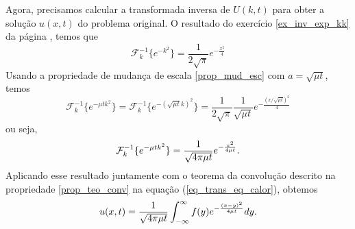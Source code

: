 Agora, precisamos calcular a transformada inversa de $U(k,t)$ para obter a solução $u(x,t)$ do problema original. O resultado do exercício \ref{ex_inv_exp_kk} da página \pageref{ex_inv_exp_kk}, temos que
$$
\mathcal{F}^{-1}_k\{e^{-k^2}\}=\frac{1}{2\sqrt{\pi}} e^{-\frac{x^2}{4}}
$$
Usando a propriedade de mudança de escala \ref{prop_mud_esc} com $a=\sqrt{\mu t}$, temos
$$
\mathcal{F}_k^{-1}\{e^{-\mu t k^2}\}=\mathcal{F}_k^{-1}\{e^{-(\sqrt{\mu t} k)^2}\}=\frac{1}{2\sqrt{\pi}}\frac{1}{\sqrt{\mu t}} e^{-\frac{\left(x/\sqrt{\mu t}\right)^2}{4}}
$$
ou seja,
\begin{equation}{\label{eq_calor_02}}
\mathcal{F}_k^{-1}\{e^{-\mu t k^2}\}=\frac{1}{\sqrt{4\pi\mu t}} e^{-\frac{x^2}{4\mu t}}.
\end{equation}
Aplicando esse resultado juntamente com o teorema da convolução descrito na propriedade \ref{prop_teo_conv} na equação (\ref{eq_trans_eq_calor}), obtemos
\begin{equation}{\label{eq_dif_calor}}
u(x,t)=\frac{1}{\sqrt{4\pi \mu t}}\int_{-\infty}^\infty
f(y)e^{-\frac{(x-y)^2}{4\mu t}}dy.
\end{equation}

